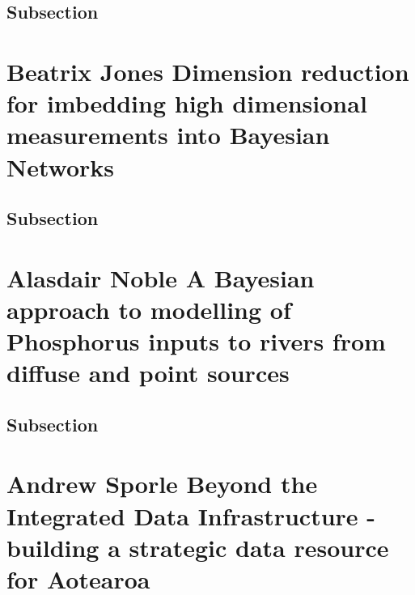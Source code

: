 \documentclass[
]{book}
\begin{document}
\hypertarget{subsection}{%
\section{Subsection}\label{subsection}}

\hypertarget{beatrix-jones-dimension-reduction-for-imbedding-high-dimensional-measurements-into-bayesian-networks}{%
\chapter*{Beatrix Jones \textbar{} Dimension reduction for imbedding high dimensional measurements into Bayesian Networks}\label{beatrix-jones-dimension-reduction-for-imbedding-high-dimensional-measurements-into-bayesian-networks}}

\hypertarget{subsection}{%
\section{Subsection}\label{subsection}}

\hypertarget{alasdair-noble-a-bayesian-approach-to-modelling-of-phosphorus-inputs-to-rivers-from-diffuse-and-point-sources}{%
\chapter*{Alasdair Noble\textbar{} A Bayesian approach to modelling of Phosphorus inputs to rivers from diffuse and point sources}\label{alasdair-noble-a-bayesian-approach-to-modelling-of-phosphorus-inputs-to-rivers-from-diffuse-and-point-sources}}

\hypertarget{subsection}{%
\section{Subsection}\label{subsection}}

\hypertarget{andrew-sporle-beyond-the-integrated-data-infrastructure---building-a-strategic-data-resource-for-aotearoa}{%
\chapter*{Andrew Sporle \textbar{} Beyond the Integrated Data Infrastructure - building a strategic data resource for Aotearoa}\label{andrew-sporle-beyond-the-integrated-data-infrastructure---building-a-strategic-data-resource-for-aotearoa}}
\end{document}
